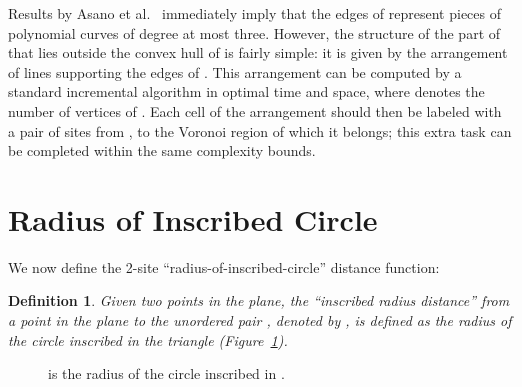 \documentclass[10pt, conference, compsocconf]{IEEEtran}
\newtheorem{definition}{Definition}
\begin{document}
Results by Asano et al.~\cite{AKTT06} immediately imply that the edges of
 represent pieces of polynomial curves of degree at most
three.  However, the structure of the part of  that lies
outside the convex hull  of  is fairly simple: it is
given by the arrangement of lines supporting the edges of .
This arrangement can be computed by a standard incremental algorithm in
optimal  time and space, where  denotes the number of
vertices of .  Each cell of the arrangement should then be
labeled with a pair of sites from , to the Voronoi region of which it
belongs; this extra task can be completed within the same complexity bounds.



\section{Radius of Inscribed Circle}

We now define the 2-site ``radius-of-inscribed-circle'' distance function:
\begin{definition}
   Given two points  in the plane, the ``inscribed radius distance''
    from a point  in the plane to the unordered pair ,
   denoted by , is defined as the radius of the circle
   inscribed in the triangle  (Figure~\ref{fig:inscr}).
\end{definition}

   \begin{figure}
\centering
{}
      \caption{ is the radius of the circle inscribed in
               .}
      \label{fig:inscr}
   \end{figure}
\end{document}
